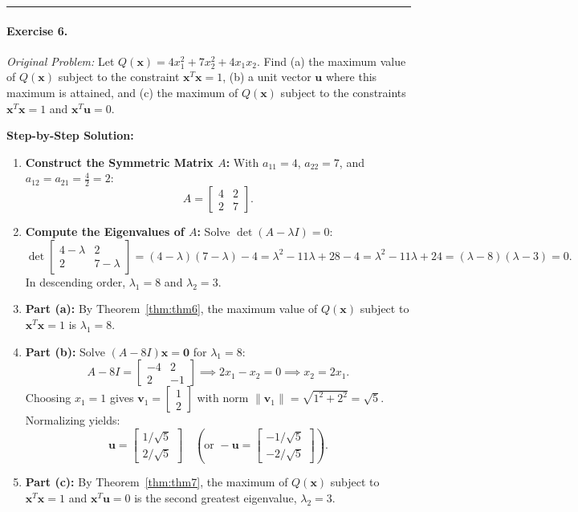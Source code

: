 \documentclass[11pt, letterpaper]{article}
\theoremstyle{definition}
\theoremstyle{remark}
\begin{document}
\medskip
\hrule
\medskip

\paragraph{Exercise 6.}
\emph{Original Problem:} Let $Q(\mathbf{x}) = 4x_1^2 + 7x_2^2 + 4x_1 x_2$. Find (a) the maximum value of $Q(\mathbf{x})$ subject to the constraint $\mathbf{x}^T \mathbf{x} = 1$, (b) a unit vector $\mathbf{u}$ where this maximum is attained, and (c) the maximum of $Q(\mathbf{x})$ subject to the constraints $\mathbf{x}^T \mathbf{x} = 1$ and $\mathbf{x}^T \mathbf{u} = 0$.

\textbf{Step-by-Step Solution:}
\begin{enumerate}[leftmargin=2em]
    \item \textbf{Construct the Symmetric Matrix $A$:}
    With $a_{11} = 4$, $a_{22} = 7$, and $a_{12} = a_{21} = \frac{4}{2} = 2$:
    \[
    A = \begin{bmatrix} 4 & 2 \\ 2 & 7 \end{bmatrix}.
    \]
    \item \textbf{Compute the Eigenvalues of $A$:}
    Solve $\det(A - \lambda I) = 0$:
    \[
    \det \begin{bmatrix} 4 - \lambda & 2 \\ 2 & 7 - \lambda \end{bmatrix} = (4 - \lambda)(7 - \lambda) - 4 = \lambda^2 - 11\lambda + 28 - 4 = \lambda^2 - 11\lambda + 24 = (\lambda - 8)(\lambda - 3) = 0.
    \]
    In descending order, $\lambda_1 = 8$ and $\lambda_2 = 3$.
    \item \textbf{Part (a):} By Theorem~\ref{thm:thm6}, the maximum value of $Q(\mathbf{x})$ subject to $\mathbf{x}^T \mathbf{x} = 1$ is $\lambda_1 = 8$.
    \item \textbf{Part (b):} Solve $(A - 8I)\mathbf{x} = \mathbf{0}$ for $\lambda_1 = 8$:
    \[
    A - 8I = \begin{bmatrix} -4 & 2 \\ 2 & -1 \end{bmatrix} \implies 2x_1 - x_2 = 0 \implies x_2 = 2x_1.
    \]
    Choosing $x_1 = 1$ gives $\mathbf{v}_1 = \begin{bmatrix} 1 \\ 2 \end{bmatrix}$ with norm $\|\mathbf{v}_1\| = \sqrt{1^2 + 2^2} = \sqrt{5}$. Normalizing yields:
    \[
    \mathbf{u} = \begin{bmatrix} 1/\sqrt{5} \\ 2/\sqrt{5} \end{bmatrix} \quad \left(\text{or } -\mathbf{u} = \begin{bmatrix} -1/\sqrt{5} \\ -2/\sqrt{5} \end{bmatrix}\right).
    \]
    \item \textbf{Part (c):} By Theorem~\ref{thm:thm7}, the maximum of $Q(\mathbf{x})$ subject to $\mathbf{x}^T \mathbf{x} = 1$ and $\mathbf{x}^T \mathbf{u} = 0$ is the second greatest eigenvalue, $\lambda_2 = 3$.
\end{enumerate}
\end{document}
